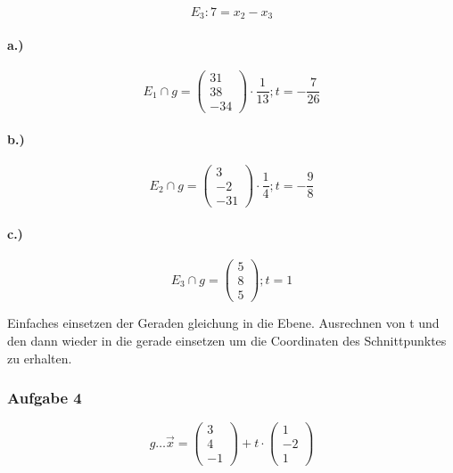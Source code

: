 \documentclass{article}
\begin{document}
\begin{equation}
	E_3 : 7 = x_2 - x_3
\end{equation}
  
\paragraph*{a.)}
\begin{equation}
	E_1 \cap g = \begin{pmatrix}31\\38\\-34\end{pmatrix} \cdot \frac{1}{13}; t =  - \frac{7}{26}
\end{equation}
\paragraph*{b.)}
\begin{equation}
	E_2 \cap g = \begin{pmatrix}3\\-2\\-31\end{pmatrix} \cdot \frac{1}{4}; t =  - \frac{9}{8}
\end{equation}
\paragraph*{c.)}
\begin{equation}
	E_3 \cap g = \begin{pmatrix}5\\8\\5\end{pmatrix} ; t = 1
\end{equation}

Einfaches einsetzen der Geraden gleichung in die Ebene. Ausrechnen von t und den dann wieder in die gerade einsetzen um die Coordinaten des Schnittpunktes zu erhalten.


\subsubsection*{Aufgabe 4}

\begin{equation}
	g \dots \overrightarrow{x} = \begin{pmatrix}3\\4\\-1\end{pmatrix} + t \cdot \begin{pmatrix}1\\-2\\1\end{pmatrix}
\end{equation}
\end{document}
